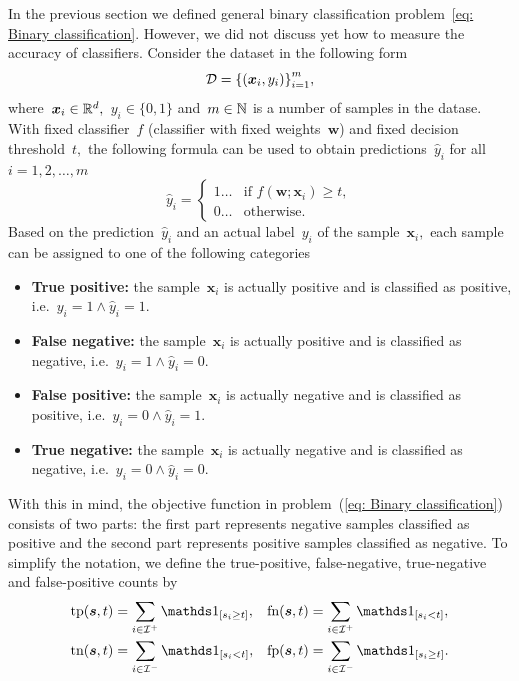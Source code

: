 In the previous section we defined general binary classification problem~\ref{eq: Binary classification}. However, we did not discuss yet how to measure the accuracy of classifiers. Consider the dataset in the following form
\begin{equation*}\label{eq: test set bin}
  \mathcal{D} = \Brac[c]{(\bm{x}_i, y_i)}_{i=1}^{m},
\end{equation*}
where~$\bm{x}_i \in \mathbb{R}^d,$~$y_i \in \{0, 1\}$ and~$m \in \mathbb{N}$ is a number of samples in the datase. With fixed classifier~$f$ (classifier with fixed weights~$\bm{w}$) and fixed decision threshold~$t,$ the following formula can be used to obtain predictions~$\hat{y}_i$ for all~$i = 1, 2, \ldots, m$
\begin{equation*}
  \hat{y}_i = \begin{cases}
    1 \ldots & \text{if } f(\bm{w}; \bm{x}_i) \ge t, \\
    0 \ldots & \text{otherwise.}
  \end{cases}
\end{equation*}
Based on the prediction~$\hat{y}_i$ and an actual label~$y_i$ of the sample~$\bm{x}_i,$ each sample can be assigned to one of the following categories
\begin{itemize}
  \item \textbf{True positive:} the sample~$\bm{x}_i$ is actually positive and is classified as positive, i.e.~$y_i = 1 \land \hat{y}_i = 1.$
  \item \textbf{False negative:} the sample~$\bm{x}_i$ is actually positive and is classified as negative, i.e.~$y_i = 1 \land \hat{y}_i = 0.$
  \item \textbf{False positive:} the sample~$\bm{x}_i$ is actually negative and is classified as positive, i.e.~$y_i = 0 \land \hat{y}_i = 1.$
  \item \textbf{True negative:} the sample~$\bm{x}_i$ is actually negative and is classified as negative, i.e.~$y_i = 0 \land \hat{y}_i = 0.$
\end{itemize}
With this in mind, the objective function in problem~(\ref{eq: Binary classification}) consists of two parts: the first part represents negative samples classified as positive and the second part represents positive samples classified as negative. To simplify the notation, we define the true-positive, false-negative, true-negative and false-positive counts by
\begin{equation}\label{eq: confusion counts}
  \begin{aligned}
    \tp(\bm{s}, t) & = \sum_{i \in \I^+}\Iverson{s_i \ge t}, &
    \fn(\bm{s}, t) & = \sum_{i \in \I^+}\Iverson{s_i < t}, \\
    \tn(\bm{s}, t) & = \sum_{i \in \I^-}\Iverson{s_i < t}, &
    \fp(\bm{s}, t) & = \sum_{i \in \I^-}\Iverson{s_i \ge t}.
  \end{aligned}
\end{equation}
